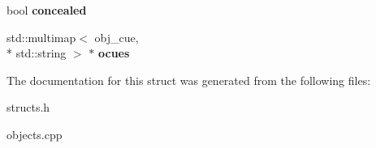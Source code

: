 \begin{DoxyCompactItemize}
\item 
\hypertarget{structobj__data_aba9df06479ef99a06974b669d486e8df}{bool {\bfseries concealed}}\label{structobj__data_aba9df06479ef99a06974b669d486e8df}

\item 
\hypertarget{structobj__data_a9252063584afada9689c7b3fcdee0494}{std\-::multimap$<$ obj\-\_\-cue, \\*
std\-::string $>$ $\ast$ {\bfseries ocues}}\label{structobj__data_a9252063584afada9689c7b3fcdee0494}

\end{DoxyCompactItemize}


The documentation for this struct was generated from the following files\-:\begin{DoxyCompactItemize}
\item 
structs.\-h\item 
objects.\-cpp\end{DoxyCompactItemize}
